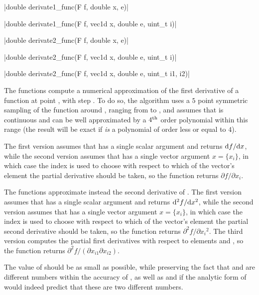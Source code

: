 \funcitem \cppinline|double derivate1_func(F f, double x, e)| 

\cppinline|double derivate1_func(F f, vec1d x, double e, uint_t i)|

\cppinline|double derivate2_func(F f, double x, e)| 

\cppinline|double derivate2_func(F f, vec1d x, double e, uint_t i)|

\cppinline|double derivate2_func(F f, vec1d x, double e, uint_t i1, i2)|

The  functions compute a numerical approximation of the first derivative of a function  at point , with step . To do so, the algorithm uses a $5$ point symmetric sampling of the function around , ranging from  to , and assumes that  is continuous and can be well approximated by a $4^{\rm th}$ order polynomial within this range (the result will be exact if  \emph{is} a polynomial of order less or equal to $4$).

The first version assumes that  has a single scalar argument and returns ${\rm d}f/{\rm d}x$, while the second version assumes that  has a single vector argument $x = \{x_i\}$, in which case the index  is used to choose with respect to which of the vector's element the partial derivative should be taken, so the function returns $\partial f/\partial x_i$.

The  functions approximate instead the second derivative of . The first version assumes that  has a single scalar argument and returns ${\rm d}^2f/{\rm d}x^2$, while the second version assumes that  has a single vector argument $x = \{x_i\}$, in which case the index  is used to choose with respect to which of the vector's element the partial second derivative should be taken, so the function returns $\partial^2 f/\partial {x_i}^2$. The third version computes the partial first derivatives with respect to elements  and , so the function returns $\partial^2 f/(\partial x_{i1} \partial x_{i2})$.

The value of  should be as small as possible, while preserving the fact that  and  are different numbers within the accuracy of , as well as  and  if the analytic form of  would indeed predict that these are two different numbers.

